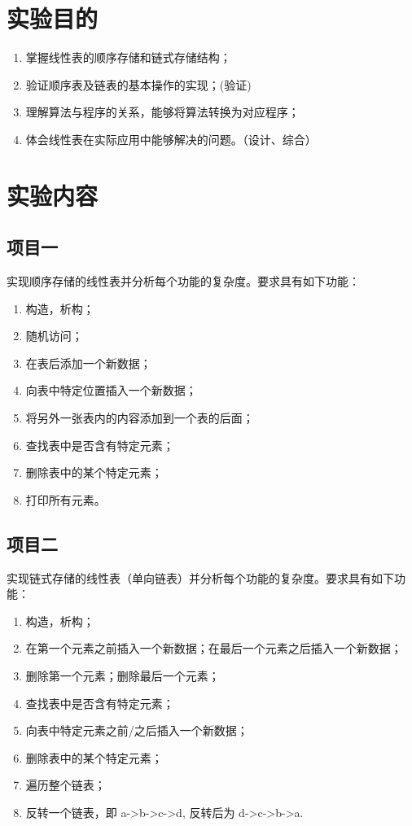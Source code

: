\newpage
\xiaosihao
\section{实验目的}
\begin{enumerate}
\item 掌握线性表的顺序存储和链式存储结构；
\item 验证顺序表及链表的基本操作的实现；(验证)
\item 理解算法与程序的关系，能够将算法转换为对应程序；
\item 体会线性表在实际应用中能够解决的问题。（设计、综合）
\end{enumerate}

\section{实验内容}
\subsection{项目一}
实现顺序存储的线性表并分析每个功能的复杂度。要求具有如下功能：
\begin{enumerate}
\item 构造，析构；
\item 随机访问；
\item 在表后添加一个新数据；
\item 向表中特定位置插入一个新数据；
\item 将另外一张表内的内容添加到一个表的后面；
\item 查找表中是否含有特定元素；
\item 删除表中的某个特定元素；
\item 打印所有元素。
\end{enumerate}

\subsection{项目二}
实现链式存储的线性表（单向链表）并分析每个功能的复杂度。要求具有如下功能：
\begin{enumerate}
\item 构造，析构；
\item 在第一个元素之前插入一个新数据；在最后一个元素之后插入一个新数据；
\item 删除第一个元素；删除最后一个元素；
\item 查找表中是否含有特定元素； 
\item 向表中特定元素之前/之后插入一个新数据；
\item 删除表中的某个特定元素；
\item 遍历整个链表；
\item 反转一个链表，即 a->b->c->d, 反转后为 d->c->b->a.
\end{enumerate}

